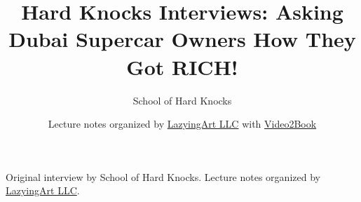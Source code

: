 \documentclass[11pt,oneside]{book}
\begin{document}
\frontmatter
\title{Hard Knocks Interviews: Asking Dubai Supercar Owners How They Got RICH!}
\author{School of Hard Knocks}
\date{Lecture notes organized by \href{https://lazying.art}{LazyingArt LLC} with \href{https://github.com/lachlanchen/Video2Book}{Video2Book}}
\maketitle
\begin{center}
\small Original interview by School of Hard Knocks. Lecture notes organized by \href{https://lazying.art}{LazyingArt LLC}.
\end{center}
\clearpage
\mainmatter

\end{document}
